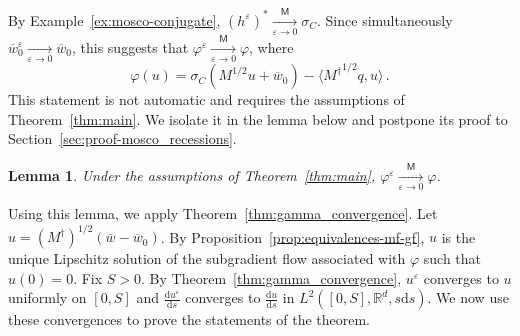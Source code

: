 \documentclass[11pt,english,reqno]{article}
\newcommand{\diff}{\mathrm{d}}
\newcommand{\R}{\mathbb{R}}
\theoremstyle{plain}
\newtheorem{lem}[proposition]{Lemma}
\theoremstyle{definition}
\theoremstyle{remark}
\numberwithin{equation}{section}
\begin{document}
By Example~\ref{ex:mosco-conjugate}, $(h^\varepsilon)^* \xrightarrow[\varepsilon \to 0]{\mathsf{M}} \sigma_C$. Since simultaneously $\overline{w}_0^\varepsilon \xrightarrow[\varepsilon \to 0]{} \overline{w}_0$, this suggests that $\varphi^\varepsilon \xrightarrow[\varepsilon\to 0]{\mathsf{M}} \varphi$, where
\begin{equation*}
	\varphi(u) = \sigma_C (M^{1/2} u + \overline{w}_0) - \langle {M^{\dagger}}^{1/2} q, u \rangle \, .
\end{equation*}
This statement is not automatic and requires the assumptions of Theorem~\ref{thm:main}. We isolate it in the lemma below and postpone its proof to Section~\ref{sec:proof-mosco_recessions}.

\begin{lem}
	\label{lem:mosco_recessions}
	Under the assumptions of Theorem~\ref{thm:main}, $\varphi^\varepsilon \xrightarrow[\varepsilon \to 0]{\mathsf{M}} \varphi$.
\end{lem}

Using this lemma, we apply Theorem~\ref{thm:gamma_convergence}. Let $u = (M^\dagger)^{1/2} (\overline{w} - \overline{w}_0)$. By Proposition~\ref{prop:equivalences-mf-gf}, $u$ is the unique Lipschitz solution of the subgradient flow associated with $\varphi$ such that $u(0) = 0$. Fix $S > 0$. By Theorem~\ref{thm:gamma_convergence}, $u^\varepsilon$ converges to $u$ uniformly on $[0,S]$ and $\frac{\diff u^\varepsilon}{\diff s}$ converges to $\frac{\diff u}{\diff s}$ in $L^2([0,S], \R^d, s \diff s)$. We now use these convergences to prove the statements of the theorem.
\end{document}

